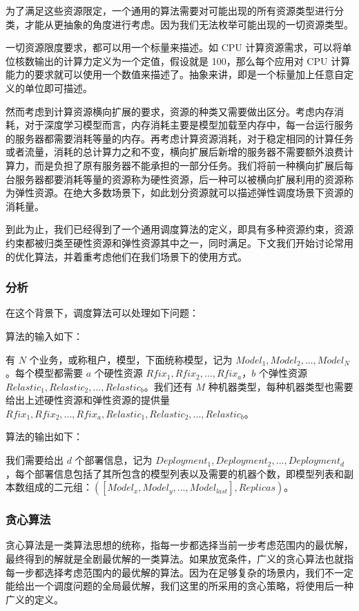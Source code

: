 为了满足这些资源限定，一个通用的算法需要对可能出现的所有资源类型进行分类，才能从更抽象的角度进行考虑。因为我们无法枚举可能出现的一切资源类型。

一切资源限度要求，都可以用一个标量来描述。如 CPU 计算资源需求，可以将单位核数输出的计算力定义为一个定值，假设就是 100，那么每个应用对 CPU 计算能力的要求就可以使用一个数值来描述了。抽象来讲，即是一个标量加上任意自定义的单位即可描述。

然而考虑到计算资源横向扩展的要求，资源的种类又需要做出区分。考虑内存消耗，对于深度学习模型而言，内存消耗主要是模型加载至内存中，每一台运行服务的服务器都需要消耗等量的内存。再考虑计算资源消耗，对于稳定相同的计算任务或者流量，消耗的总计算力之和不变，横向扩展后新增的服务器不需要额外浪费计算力，而是负担了原有服务器不能承担的一部分任务。我们将前一种横向扩展后每台服务器都要消耗等量的资源称为硬性资源，后一种可以被横向扩展利用的资源称为弹性资源。在绝大多数场景下，如此划分资源就可以描述弹性调度场景下资源的消耗量。

到此为止，我们已经得到了一个通用调度算法的定义，即具有多种资源约束，资源约束都被归类至硬性资源和弹性资源其中之一，同时满足。下文我们开始讨论常用的优化算法，并着重考虑他们在我们场景下的使用方式。

\subsubsection{分析}

在这个背景下，调度算法可以处理如下问题：

算法的输入如下：

有 $N$ 个业务，或称租户，模型，下面统称模型，记为 $Model_1,Model_2,...,Model_N$。每个模型都需要 $a$ 个硬性资源 $Rfix_1,Rfix_2,...,Rfix_a$，$b$ 个弹性资源 $Relastic_1,Relastic_2,...,Relastic_b$。我们还有 $M$ 种机器类型，每种机器类型也需要给出上述硬性资源和弹性资源的提供量 $Rfix_1,Rfix_2,...,Rfix_a,Relastic_1,Relastic_2,...,Relastic_b$。

算法的输出如下：

我们需要给出 $d$ 个部署信息，记为 $Deployment_1,Deployment_2,...,Deployment_d$，每个部署信息包括了其所包含的模型列表以及需要的机器个数，即模型列表和副本数组成的二元组：$([Model_x,Model_y,...,Model_{last}],Replicas)$。

\subsubsection{贪心算法}

贪心算法是一类算法思想的统称，指每一步都选择当前一步考虑范围内的最优解，最终得到的解就是全剧最优解的一类算法。如果放宽条件，广义的贪心算法也就指每一步都选择考虑范围内的最优解的算法。因为在足够复杂的场景内，我们不一定能给出一个调度问题的全局最优解，我们这里的所采用的贪心策略，将使用后一种广义的定义。

